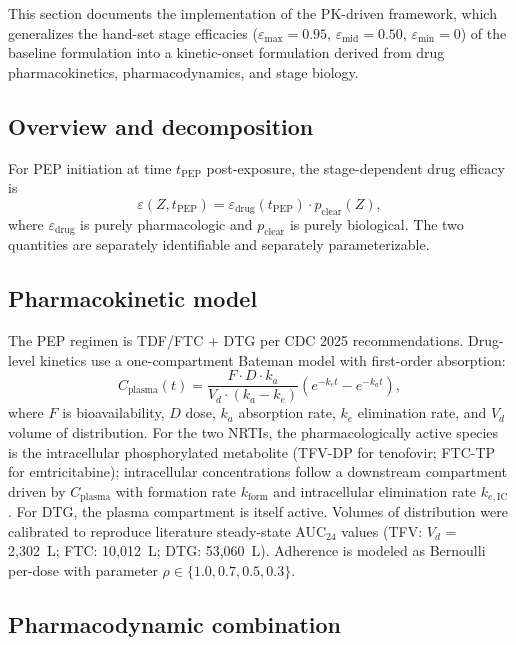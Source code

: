 \documentclass[11pt]{article}
\theoremstyle{definition}
\theoremstyle{remark}
\newcommand{\emax}{\varepsilon_{\max}}
\newcommand{\emid}{\varepsilon_{\text{mid}}}
\newcommand{\emin}{\varepsilon_{\min}}
\begin{document}
This section documents the implementation of the PK-driven framework, which generalizes the hand-set stage efficacies ($\emax = 0.95$, $\emid = 0.50$, $\emin = 0$) of the baseline formulation into a kinetic-onset formulation derived from drug pharmacokinetics, pharmacodynamics, and stage biology.

\subsection{Overview and decomposition}

For PEP initiation at time $t_{\text{PEP}}$ post-exposure, the stage-dependent drug efficacy is
\[
\varepsilon(Z, t_{\text{PEP}}) = \varepsilon_{\text{drug}}(t_{\text{PEP}}) \cdot p_{\text{clear}}(Z),
\]
where $\varepsilon_{\text{drug}}$ is purely pharmacologic and $p_{\text{clear}}$ is purely biological. The two quantities are separately identifiable and separately parameterizable.

\subsection{Pharmacokinetic model}

The PEP regimen is TDF/FTC + DTG per CDC 2025 recommendations\cite{tanner2025_si}. Drug-level kinetics use a one-compartment Bateman model with first-order absorption:
\[
C_{\text{plasma}}(t) = \frac{F \cdot D \cdot k_a}{V_d \cdot (k_a - k_e)} \left( e^{-k_e t} - e^{-k_a t} \right),
\]
where $F$ is bioavailability, $D$ dose, $k_a$ absorption rate, $k_e$ elimination rate, and $V_d$ volume of distribution. For the two NRTIs, the pharmacologically active species is the intracellular phosphorylated metabolite (TFV-DP for tenofovir; FTC-TP for emtricitabine); intracellular concentrations follow a downstream compartment driven by $C_{\text{plasma}}$ with formation rate $k_{\text{form}}$ and intracellular elimination rate $k_{e,\text{IC}}$. For DTG, the plasma compartment is itself active. Volumes of distribution were calibrated to reproduce literature steady-state AUC$_{24}$ values (TFV: $V_d$ = 2{,}302~L; FTC: 10{,}012~L; DTG: 53{,}060~L). Adherence is modeled as Bernoulli per-dose with parameter $\rho \in \{1.0, 0.7, 0.5, 0.3\}$.

\subsection{Pharmacodynamic combination}
\end{document}
